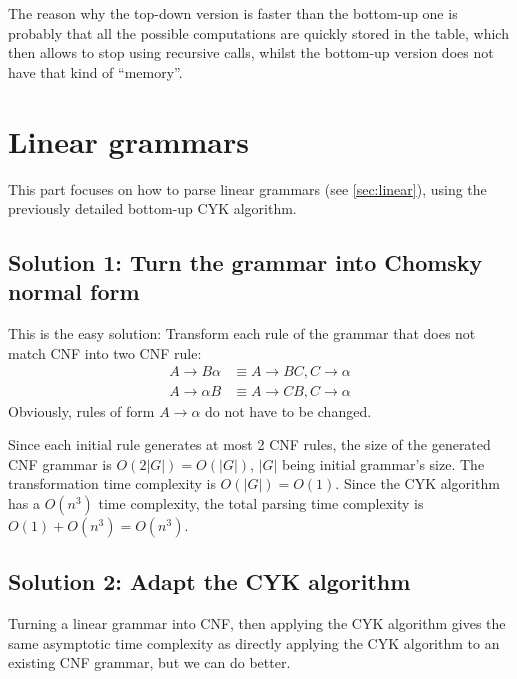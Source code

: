 \documentclass[12pt]{extarticle}
\begin{document}
\begin{multicols}{2}
The reason why the top-down version is faster than the bottom-up one is probably
that all the possible
computations are quickly stored in the table, which then allows to stop using
recursive calls, whilst the bottom-up version does not have that kind of ``memory''.


\newpage
\section{Linear grammars}
This part focuses on how to parse linear grammars (see \ref{sec:linear}), using the
previously detailed bottom-up CYK algorithm.

\subsection{Solution 1: Turn the grammar into Chomsky normal form}
This is the easy solution: Transform each rule of the grammar that does not
match CNF into two CNF rule:
\begin{align*}
  A\rightarrow B\alpha&\equiv A\rightarrow BC,C\rightarrow\alpha \\
  A\rightarrow\alpha B&\equiv A\rightarrow CB,C\rightarrow\alpha
\end{align*}
Obviously, rules of form $A\rightarrow \alpha$ do not have to be changed.

Since each initial rule generates at most 2 CNF rules, the size of the generated
CNF grammar is $O(2|G|)=O(|G|)$, $|G|$ being initial grammar's size. The
transformation time complexity is $O(|G|) = O(1)$.
Since the CYK algorithm has a $O(n^3)$ time complexity, the total parsing time complexity is $O(1)+O(n^3)=O(n^3)$.

\subsection{Solution 2: Adapt the CYK algorithm}
Turning a linear grammar into CNF, then applying the CYK algorithm gives the
same asymptotic time complexity as directly
applying the CYK algorithm to an existing CNF grammar, but we can do better.


\end{multicols}
\end{document}
